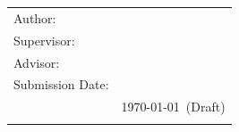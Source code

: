 \begin{titlepage}
  \centering

  \oTUM{38mm}

  \vspace{5mm}
  {\huge\MakeUppercase{\getFaculty{}}}\\

  \vspace{5mm}
  {\large\MakeUppercase{\getUniversity{}}}\\

  \vspace{20mm}
  {\Large \getDoctype{}}

  \vspace{15mm}
  {\huge\bfseries \getTitle{}}

  \vspace{10mm}
  {\huge\bfseries \getTitleGer{}}

  \vspace{10mm}
  \begin{tabular}{l l}
    Author: & \getAuthor{} \\
    Supervisor: & \getSupervisor{} \\
    Advisor: & \getAdvisor{} \\
    Submission Date: & \getSubmissionDate{} \\
    \ifdraft{Version: & \today ~(Draft)\\}{}
  \end{tabular}

\end{titlepage}
\cleardoublepage{}
